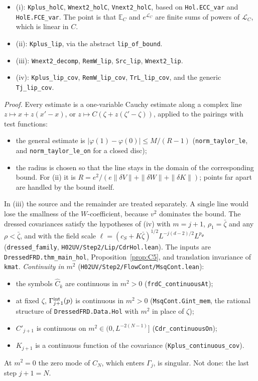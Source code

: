 \documentclass[11pt]{amsart}
\theoremstyle{definition}
\theoremstyle{remark}
\numberwithin{equation}{section}
\newcommand{\E}{\mathbb{E}}
\newcommand{\cL}{\mathcal{L}}
\begin{document}
\begin{itemize}
\item (i): \texttt{Kplus\_holC}, \texttt{Wnext2\_holC}, \texttt{Vnext2\_holC}, based on
  \texttt{Hol.ECC\_var} and \texttt{HolE.FCE\_var}. The point is that $\E_C$ and $e^{\cL_C}$ are finite sums of
  powers of $\cL_C$, which is linear in $C$.
\item (ii): \texttt{Kplus\_lip}, via the abstract \texttt{lip\_of\_bound}.
\item (iii): \texttt{Wnext2\_decomp}, \texttt{RemW\_lip}, \texttt{Src\_lip}, \texttt{Wnext2\_lip}.
\item (iv): \texttt{Kplus\_lip\_cov}, \texttt{RemW\_lip\_cov}, \texttt{TrL\_lip\_cov}, and the generic
  \texttt{Tj\_lip\_cov}.
\end{itemize}
\emph{Proof.} Every estimate is a one-variable Cauchy estimate along a complex line
$z\mapsto x+z(x'-x)$, or $z\mapsto C(\zeta+z(\zeta'-\zeta))$, applied to the pairings with test
functions:
\begin{itemize}
\item the general estimate is $|\varphi(1)-\varphi(0)|\le M/(R-1)$ (\texttt{norm\_taylor\_le}, and
  \texttt{norm\_taylor\_le\_on} for a closed disc);
\item the radius is chosen so that the line stays in the domain of the corresponding bound. For (ii)
  it is $R=e^2/(e\|\delta V\|+\|\delta W\|+\|\delta K\|)$; points far apart are handled by the bound
  itself.
\end{itemize}
In (iii) the source and the remainder are treated separately. A single line would lose the
smallness of the $W$-coefficient, because $v^2$ dominates the bound. The dressed covariances
satisfy the hypotheses of (iv) with $m=j+1$, $\rho_1=\bar\zeta$ and any $\rho<\bar\zeta$, and with the field scale
$\ell=(c_S+K\bar\zeta)^{1/2}L^{-j(d-2)/2}L^{p_\Phi}$ (\texttt{dressed\_family}, \texttt{H02UV/Step2/Lip/CdrHol.lean}).
The inputs are \texttt{DressedFRD.thm\_main\_hol}, Proposition~\ref{prop:C5}, and translation invariance of
\texttt{kmat}.
\emph{Continuity in $m^2$} (\texttt{H02UV/Step2/FlowCont/MsqCont.lean}):
\begin{itemize}
\item the symbols $\hat C_k$ are continuous in $m^2>0$ (\texttt{frdC\_continuousAt});
\item at fixed $\zeta$, $\Gamma^{\rm int}_{j+1}(p)$ is continuous in $m^2>0$
  (\texttt{MsqCont.Gint\_mem}, the rational structure of \texttt{DressedFRD.Data.Hol} with $m^2$ in
  place of $\zeta$);
\item $C'_{j+1}$ is continuous on $m^2\in(0,L^{-2(N-1)}]$ (\texttt{Cdr\_continuousOn});
\item $K_{j+1}$ is a continuous function of the covariance (\texttt{Kplus\_continuous\_cov}).
\end{itemize}
At $m^2=0$ the zero mode of $C_N$, which enters $\Gamma_j$, is singular. Not done: the last step
$j+1=N$.
\end{document}
